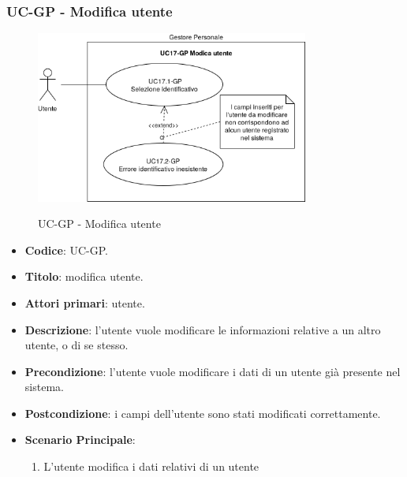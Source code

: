 \subsubsection{UC\theuccount-GP - Modifica utente}
		\begin{figure}[H]
			\centering
				\includegraphics[width=0.8\textwidth]{img/casi_d'uso/UC17.png}\\
			\caption{UC\theuccount-GP - Modifica utente}
		\end{figure}
	\begin{itemize}
		\item \textbf{Codice}: UC\theuccount-GP.
		\item \textbf{Titolo}: modifica utente.
		\item \textbf{Attori primari}: utente.
		\item \textbf{Descrizione}: l’utente vuole modificare le informazioni relative a un altro utente, o di se stesso.
		\item \textbf{Precondizione}: l'utente vuole modificare i dati di un utente già presente nel sistema.
		\item \textbf{Postcondizione}: i campi dell'utente sono stati modificati correttamente.
		\item \textbf{Scenario Principale}:
		\begin{enumerate}
			\item L'utente modifica i dati relativi di un utente
		\end{enumerate}
	\end{itemize}
	

